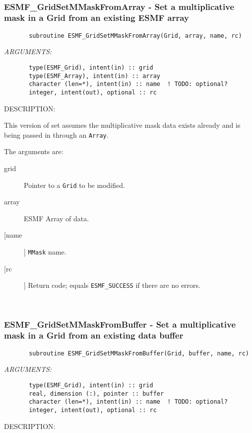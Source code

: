 {%
 
\mbox{}\hrulefill\ 
 
\subsubsection{ESMF\_GridSetMMaskFromArray - Set a multiplicative mask in a Grid from an existing ESMF array}


 
\begin{verbatim}       subroutine ESMF_GridSetMMaskFromArray(Grid, array, name, rc)\end{verbatim}{\em ARGUMENTS:}
\begin{verbatim}       type(ESMF_Grid), intent(in) :: grid
       type(ESMF_Array), intent(in) :: array
       character (len=*), intent(in) :: name  ! TODO: optional?
       integer, intent(out), optional :: rc            \end{verbatim}
{\sf DESCRIPTION:\\ }


       This version of set assumes the multiplicative mask data exists already
       and is being passed in through an {\tt Array}.
  
       The arguments are:
       \begin{description}
       \item[grid] 
            Pointer to a {\tt Grid} to be modified.
       \item[array]
            ESMF Array of data.
       \item [[name]]
             {\tt MMask} name.
       \item[[rc]] 
            Return code; equals {\tt ESMF\_SUCCESS} if there are no errors.
       \end{description}
   
 
\mbox{}\hrulefill\ 
 
\subsubsection{ESMF\_GridSetMMaskFromBuffer - Set a multiplicative mask in a Grid from an existing data buffer}


 
\begin{verbatim}       subroutine ESMF_GridSetMMaskFromBuffer(Grid, buffer, name, rc)\end{verbatim}{\em ARGUMENTS:}
\begin{verbatim}       type(ESMF_Grid), intent(in) :: grid
       real, dimension (:), pointer :: buffer
       character (len=*), intent(in) :: name  ! TODO: optional?
       integer, intent(out), optional :: rc            \end{verbatim}
{\sf DESCRIPTION:\\ }


}
